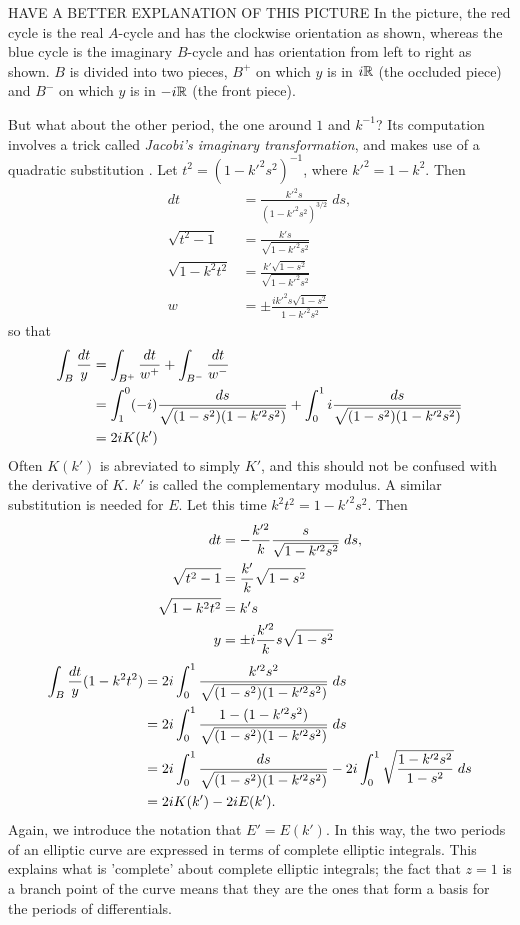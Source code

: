 HAVE A BETTER EXPLANATION OF THIS PICTURE  In the picture, the red cycle is the real $A$-cycle and has the clockwise orientation as shown, whereas the blue cycle is the imaginary $B$-cycle and has orientation from left to right as shown. $B$ is divided into two pieces, $B^+$ on which $y$ is in $i\mathbb{R}$ (the occluded piece) and $B^-$ on which $y$ is in $-i\mathbb{R}$ (the front piece).

But what about the other period, the one around $1$ and $k^{-1}$? Its computation involves a trick called {\it Jacobi's imaginary transformation}, and makes use of a quadratic substitution \cite{Whittaker2000}. Let $t^2 = (1-k'^2 s^2)^{-1}$, where $k'^2 = 1 - k^2$. Then
\begin{align*}
dt &= \frac{k'^2 s}{(1-k'^2 s^2)^{3/2}}\;ds, \\
\sqrt{t^2 - 1} &= \frac{k's}{\sqrt{1-k'^2 s^2}} \\
\sqrt{1 - k^2 t^2} &= \frac{k' \sqrt{1-s^2}}{\sqrt{1-k'^2 s^2}} \\
w &= \pm \frac{i k'^2 s \sqrt {1-s^2}}{1-k'^2 s^2}
\end{align*}
so that
\begin{align*}
\int_B \frac{dt}{y}
&= \int_{B^+} \frac{dt}{w^+} + \int_{B^-} \frac{dt}{w^-} \\
&= \int_1^0 (-i) \frac{ds}{\sqrt{(1-s^2)(1-k'^2 s^2)}} + \int_0^1 i \frac{ds}{\sqrt{(1-s^2)(1-k'^2 s^2)}}\\
&= 2i K(k')
\end{align*}
Often $K(k')$ is abreviated to simply $K'$, and this should not be confused with the derivative of $K$. $k'$ is called the complementary modulus. A similar substitution is needed for $E$. Let this time $k^2 t^2 = 1-k'^2 s^2$. Then
\begin{align*}
dt &= -\frac{k'^2}{k} \frac{s}{\sqrt{1-k'^2 s^2}}\;ds,\\
\sqrt{t^2 - 1} &= \frac{k'}{k}\sqrt{1-s^2} \\
\sqrt{1 - k^2 t^2} &= k's\\
y &= \pm i \frac{k'^2}{k}s\sqrt{1-s^2}
\end{align*}
\begin{align*}
\int_B \frac{dt}{y}(1-k^2t^2)
&= 2i \int_0^1 \frac{k'^2 s^2}{\sqrt{(1-s^2)(1-k'^2 s^2)}}\;ds \\
&= 2i \int_0^1 \frac{1-(1-k'^2 s^2)}{\sqrt{(1-s^2)(1-k'^2 s^2)}}\;ds \\
&= 2i \int_0^1 \frac{ds}{\sqrt{(1-s^2)(1-k'^2 s^2)}} - 2i \int_0^1 \sqrt{\frac{1-k'^2 s^2}{1-s^2}}\;ds\\
&= 2iK(k') - 2iE(k').
\end{align*}
Again, we introduce the notation that $E' = E(k')$. In this way, the two periods of an elliptic curve are expressed in terms of complete elliptic integrals. This explains what is 'complete' about complete elliptic integrals; the fact that $z=1$ is a branch point of the curve means that they are the ones that form a basis for the periods of differentials.





